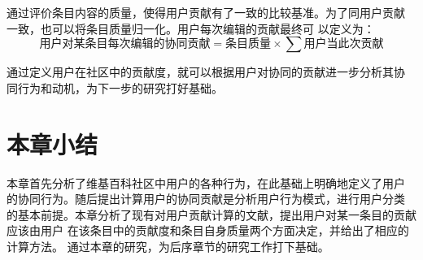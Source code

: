 通过评价条目内容的质量，使得用户贡献有了一致的比较基准。为了同用户贡献
一致，也可以将条目质量归一化。用户每次编辑的贡献最终可
以定义为：
\[
\text{用户对某条目每次编辑的协同贡献}=\text{条目质量} \times  \sum
\text{用户当此次贡献}
\]


通过定义用户在社区中的贡献度，就可以根据用户对协同的贡献进一步分析其协
同行为和动机，为下一步的研究打好基础。




\section{本章小结}
本章首先分析了维基百科社区中用户的各种行为，在此基础上明确地定义了用户
的协同行为。随后提出计算用户的协同贡献是分析用户行为模式，进行用户分类
的基本前提。本章分析了现有对用户贡献计算的文献，提出用户对某一条目的贡献应该由用户
在该条目中的贡献度和条目自身质量两个方面决定，并给出了相应的计算方法。
通过本章的研究，为后序章节的研究工作打下基础。


